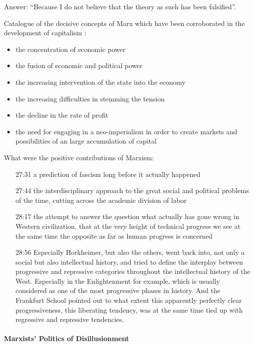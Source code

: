 \documentclass[10pt,titlepage]{book}
\begin{document}
Answer: ``Because I do not believe that the theory as such has been falsified''.

Catalogue of the decisive
concepts of Marx which have been
corroborated in the development of
capitalism :
\begin{itemize}
  \item the concentration of economic power
    \item the fusion of economic and      political power
      \item the increasing     intervention of the state into the economy
      \item the increasing difficulties in stemming the tension
      \item the decline in the rate of profit
      \item the need for engaging in a neo-imperialism in order to create markets and possibilities of an large accumulation of capital
\end {itemize}

What were the positive contributions of Marxism:
\begin{itemize}
\item[27:31] a prediction of fascism long before it actually happened
  \item[27:44] the interdisciplinary
approach to the great social and
political problems of the time, cutting
across the academic division of labor
\item[28:17]
the attempt to answer the question what actually has gone wrong in Western
civilization, that at the very height of technical progress we see at the same
time the opposite as far as human progress is concerned
\item[28:56] Especially Horkheimer, but also the others, went back into, not only
a social but also intellectual history, and tried to define the interplay
between progressive and repressive categories throughout the intellectual
history of the West.
Especially in the Enlightenment for example,
which is usually considered as one of the most progressive phases in history.
And the Frankfurt School pointed out to what extent this
apparently perfectly clear progressiveness, this liberating tendency,
was at the same time tied up with regressive and repressive tendencies. 
\end{itemize}

\paragraph{Marxists' Politics of Disillusionment}
\end{document}
